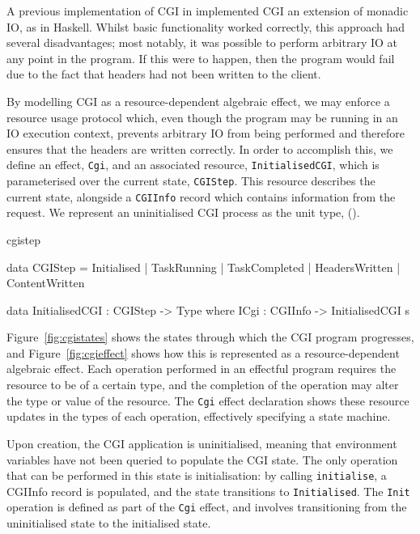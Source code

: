 A previous implementation of CGI in \idris{} implemented CGI an extension of monadic IO, as in Haskell. Whilst basic functionality worked correctly, this approach had several disadvantages; most notably, it was possible to perform arbitrary IO at any point in the program. If this were to happen, then the program would fail due to the fact that headers had not been written to the client.

By modelling CGI as a resource-dependent algebraic effect, we may enforce a resource usage protocol which, even though the program may be running in an IO execution context, prevents arbitrary IO from being performed and therefore ensures that the headers are written correctly. In order to accomplish this, we define an effect, \texttt{Cgi}, and an associated resource, \texttt{InitialisedCGI}, which is parameterised over the current state, \texttt{CGIStep}. This resource describes the current state, alongside a \texttt{CGIInfo} record which contains information from the request. We represent an uninitialised CGI process as the unit type, ().

\begin{SaveVerbatim}{cgistep}

data CGIStep = Initialised   | TaskRunning 
             | TaskCompleted | HeadersWritten 
             | ContentWritten

data InitialisedCGI : CGIStep -> Type where
     ICgi : CGIInfo -> InitialisedCGI s

\end{SaveVerbatim}

\noindent
Figure~\ref{fig:cgistates} shows the states through which the CGI program
progresses, and Figure~\ref{fig:cgieffect} shows how this is represented
as a resource-dependent algebraic effect. Each operation performed in an effectful
program requires the resource to be of a certain type, and the completion of
the operation may alter the type or value of the resource. The \texttt{Cgi}
effect declaration shows these resource updates in the types of each operation,
effectively specifying a state machine.

Upon creation, the CGI application is uninitialised, meaning that environment variables have not been queried to populate the CGI state. The only operation
that can be performed in this state is initialisation: by calling
\texttt{initialise}, a CGIInfo record is populated, and the state transitions
to \texttt{Initialised}. The \texttt{Init} operation is defined as part of the
\texttt{Cgi} effect, and involves transitioning from the uninitialised state to
the initialised state.

